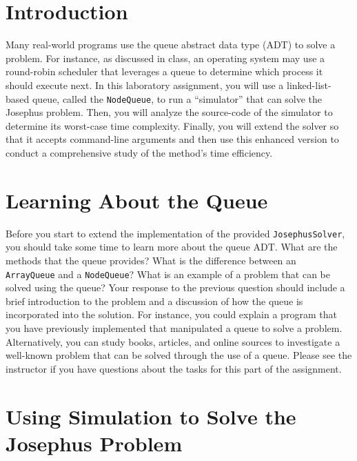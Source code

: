 

\usepackage[compact]{titlesec}


\section*{Introduction}

  Many real-world programs use the queue abstract data type (ADT) to solve a problem.  For instance, as discussed in
  class, an operating system may use a round-robin scheduler that leverages a queue to determine which process it should
  execute next. In this laboratory assignment, you will use a linked-list-based queue, called the {\tt NodeQueue}, to
  run a ``simulator'' that can solve the Josephus problem. Then, you will analyze the source-code of the simulator to
  determine its worst-case time complexity.  Finally, you will extend the solver so that it accepts command-line
  arguments and then use this enhanced version to conduct a comprehensive study of the method's time efficiency.

\section*{Learning About the Queue}

  Before you start to extend the implementation of the provided {\tt JosephusSolver}, you should take some time to learn
  more about the queue ADT.  What are the methods that the queue provides?  What is the difference between an {\tt
    ArrayQueue} and a {\tt NodeQueue}? What is an example of a problem that can be solved using the queue? Your response
  to the previous question should include a brief introduction to the problem and a discussion of how the queue is
  incorporated into the solution. For instance, you could explain a program that you have previously implemented that
  manipulated a queue to solve a problem.  Alternatively, you can study books, articles, and online sources to
  investigate a well-known problem that can be solved through the use of a queue.  Please see the instructor if you have
  questions about the tasks for this part of the assignment.

\section*{Using Simulation to Solve the Josephus Problem}

